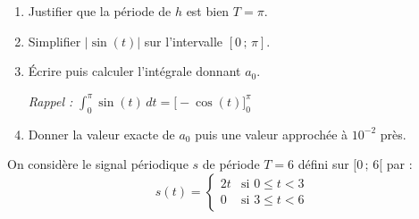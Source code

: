 \documentclass[a4paper,11pt]{article}
\begin{document}
\begin{enumerate}[label=\textbf{\alph*)}]
  \item Justifier que la période de $h$ est bien $T = \pi$.
  \begin{tcolorbox}[reponsebox, height=1.5cm]\end{tcolorbox}
  \item Simplifier $|{\sin(t)}|$ sur l'intervalle $[0\,;\,\pi]$.
  \begin{tcolorbox}[reponsebox, height=1.5cm]\end{tcolorbox}
  \item Écrire puis calculer l'intégrale donnant $a_0$.

  \textit{Rappel :} $\displaystyle\int_0^{\pi} \sin(t)\,dt = \Big[-\cos(t)\Big]_0^{\pi}$
  \begin{tcolorbox}[reponsebox, height=3cm]\end{tcolorbox}
  \item Donner la valeur exacte de $a_0$ puis une valeur approchée à $10^{-2}$ près.
  \begin{tcolorbox}[reponsebox, height=1.5cm]\end{tcolorbox}
\end{enumerate}

\vspace{0.3cm}

\begin{tcolorbox}[exobox={Exercice 4 -- Synthèse}]
  On considère le signal périodique $s$ de période $T = 6$ défini sur $[0\,;\,6[$ par :
  \[
    s(t) = \begin{cases} 2t & \text{si } 0 \leq t < 3 \\ 0 & \text{si } 3 \leq t < 6 \end{cases}
  \]
\end{tcolorbox}
\end{document}

